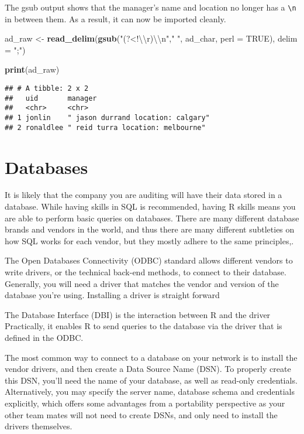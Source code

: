 \documentclass[
]{book}
\newenvironment{Shaded}{\begin{snugshade}}{\end{snugshade}}
\newcommand{\CharTok}[1]{\textcolor[rgb]{0.31,0.60,0.02}{#1}}
\newcommand{\DataTypeTok}[1]{\textcolor[rgb]{0.13,0.29,0.53}{#1}}
\newcommand{\KeywordTok}[1]{\textcolor[rgb]{0.13,0.29,0.53}{\textbf{#1}}}
\newcommand{\NormalTok}[1]{#1}
\newcommand{\OtherTok}[1]{\textcolor[rgb]{0.56,0.35,0.01}{#1}}
\newcommand{\StringTok}[1]{\textcolor[rgb]{0.31,0.60,0.02}{#1}}
\begin{document}
The gsub output shows that the manager's name and location no longer has a \texttt{\textbackslash{}n} in between them. As a result, it can now be imported cleanly.

\begin{Shaded}
\begin{Highlighting}[]
\NormalTok{ad_raw <-}\StringTok{ }\KeywordTok{read_delim}\NormalTok{(}\KeywordTok{gsub}\NormalTok{(}\StringTok{"(?<!}\CharTok{\textbackslash{}\textbackslash{}}\StringTok{r)}\CharTok{\textbackslash{}\textbackslash{}}\StringTok{n"}\NormalTok{,}\StringTok{" "}\NormalTok{, ad_char, }\DataTypeTok{perl =} \OtherTok{TRUE}\NormalTok{), }\DataTypeTok{delim =} \StringTok{";"}\NormalTok{)}

\KeywordTok{print}\NormalTok{(ad_raw)}
\end{Highlighting}
\end{Shaded}

\begin{verbatim}
## # A tibble: 2 x 2
##   uid       manager                           
##   <chr>     <chr>                             
## 1 jonlin    " jason durrand location: calgary"
## 2 ronaldlee " reid turra location: melbourne"
\end{verbatim}

\hypertarget{databases-1}{%
\section{Databases}\label{databases-1}}

It is likely that the company you are auditing will have their data stored in a database. While having skills in SQL is recommended, having R skills means you are able to perform basic queries on databases. There are many different database brands and vendors in the world, and thus there are many different subtleties on how SQL works for each vendor, but they mostly adhere to the same principles,.

The Open Databases Connectivity (ODBC) standard allows different vendors to write drivers, or the technical back-end methods, to connect to their database. Generally, you will need a driver that matches the vendor and version of the database you're using. Installing a driver is straight forward

The Database Interface (DBI) is the interaction between R and the driver Practically, it enables R to send queries to the database via the driver that is defined in the ODBC.

The most common way to connect to a database on your network is to install the vendor drivers, and then create a Data Source Name (DSN). To properly create this DSN, you'll need the name of your database, as well as read-only credentials. Alternatively, you may specify the server name, database schema and credentials explicitly, which offers some advantages from a portability perspective as your other team mates will not need to create DSNs, and only need to install the drivers themselves.
\end{document}
